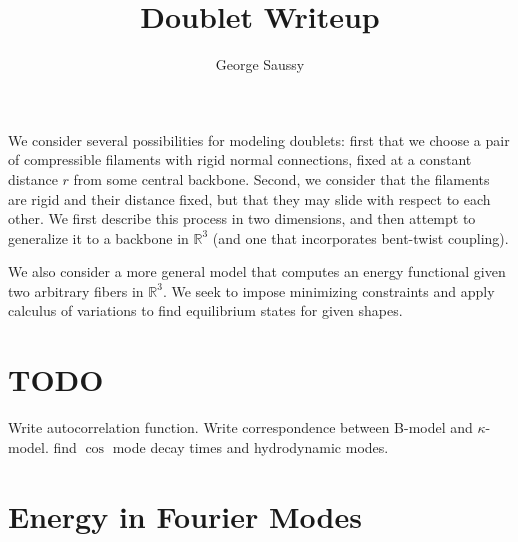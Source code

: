 \documentclass{article}
\theoremstyle{exampstyle} \newtheorem*{remark}{Remark}
\newcommand{\1}{\mathds{1}}
\begin{document}
\title{Doublet Writeup}
\author{George Saussy}
\maketitle

We consider several possibilities for modeling doublets: first that we choose a pair of compressible filaments with rigid normal connections, fixed at a constant distance $r$ from some central backbone. Second, we consider that the filaments are rigid and their distance fixed, but that they may slide with respect to each other. We first describe this process in two dimensions, and then attempt to generalize it to a backbone in $\mathbb{R}^3$ (and one that incorporates bent-twist coupling).

We also consider a more general model that computes an energy functional given two arbitrary fibers in $\mathbb{R}^3$. We seek to impose minimizing constraints and apply calculus of variations to find equilibrium states for given shapes.

\section{TODO}

Write autocorrelation function. Write correspondence between B-model and $\kappa$-model. find $\cos$ mode decay times and hydrodynamic modes.



\section{Energy in Fourier Modes}
\end{document}
